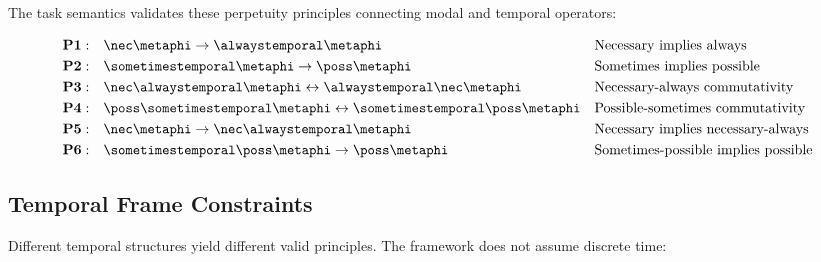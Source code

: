 \documentclass[../LogosReference.tex]{subfiles}
\begin{document}
The task semantics validates these perpetuity principles connecting modal and temporal operators:

\begin{definition}\label{def:perpetuity}
	\begin{align}
		\textbf{P1}: \quad & \nec\metaphi \to \alwaystemporal\metaphi                                        &  & \text{Necessary implies always}            \\
		\textbf{P2}: \quad & \sometimestemporal\metaphi \to \poss\metaphi                                    &  & \text{Sometimes implies possible}          \\
		\textbf{P3}: \quad & \nec\alwaystemporal\metaphi \leftrightarrow \alwaystemporal\nec\metaphi         &  & \text{Necessary-always commutativity}      \\
		\textbf{P4}: \quad & \poss\sometimestemporal\metaphi \leftrightarrow \sometimestemporal\poss\metaphi &  & \text{Possible-sometimes commutativity}    \\
		\textbf{P5}: \quad & \nec\metaphi \to \nec\alwaystemporal\metaphi                                    &  & \text{Necessary implies necessary-always}  \\
		\textbf{P6}: \quad & \sometimestemporal\poss\metaphi \to \poss\metaphi                               &  & \text{Sometimes-possible implies possible}
	\end{align}
\end{definition}


\subsection{Temporal Frame Constraints}\label{sec:temporal-constraints}

Different temporal structures yield different valid principles.
The framework does not assume discrete time:
\end{document}
